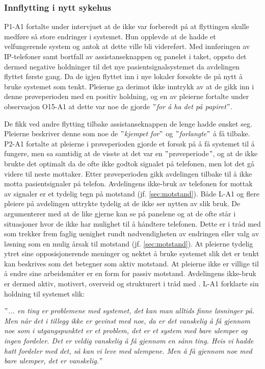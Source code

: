 \subsubsection{Innflytting i nytt sykehus}
P1-A1 fortalte under intervjuet at de ikke var forberedt på at flyttingen skulle medføre så store endringer i systemet. Hun opplevde at de hadde et velfungerende system og antok at dette ville bli videreført. Med innføringen av IP-telefoner samt bortfall av assistanseknappen og panelet i taket, oppsto det dermed negative holdninger til det nye pasientsignalsystemet da avdelingen flyttet første gang. Da de igjen flyttet inn i nye lokaler forsøkte de på nytt å bruke systemet som tenkt. Pleierne ga derimot ikke inntrykk av at de gikk inn i denne prøveperioden med en positiv holdning, og en av pleierne fortalte under observasjon O15-A1 at dette var noe de gjorde \textit{$"$for å ha det på papiret$"$}. 

\noindent
De fikk ved andre flytting tilbake assistanseknappen de lenge hadde ønsket seg. Pleierne beskriver denne som noe de \textit{$"$kjempet for$"$} og \textit{$"$forlangte$"$} å få tilbake. P2-A1 fortalte at pleierne i prøveperioden gjorde et forsøk på å få systemet til å fungere, men sa samtidig at de visste at det var en $"$prøveperiode$"$, og at de ikke brukte det optimalt da de ofte ikke godtok signalet på telefonen, men lot det gå videre til neste mottaker. Etter prøveperioden gikk avdelingen tilbake til å ikke motta pasientsignaler på telefon. Avdelingens ikke-bruk av telefonen for mottak av signaler er et tydelig tegn på motstand (jf. \ref{sec:motstand}). Både L-A1 og flere pleiere på avdelingen uttrykte tydelig at de ikke ser nytten av slik bruk. De argumenterer med at de like gjerne kan se på panelene og at de ofte står i situasjoner hvor de ikke har mulighet til å håndtere telefonen. Dette er i tråd med \citet{Jacobsen12} som trekker frem faglig uenighet rundt nødvendigheten av endringen eller valg av løsning som en mulig årsak til motstand (jf. \ref{sec:motstand}). At pleierne tydelig ytret sine opposisjonerende meninger og nektet å bruke systemet slik det er tenkt kan beskrives som det \citet{Lapointe05} betegner som aktiv motstand. At pleierne ikke er villige til å endre sine arbeidsmåter er en form for passiv motstand. Avdelingens ikke-bruk er dermed aktiv, motivert, overveid og strukturert i tråd med \citet{Satchell09}. L-A1 forklarte sin holdning til systemet slik: 

\noindent
\textit{$"$... en ting er problemene med systemet, det kan man alltids finne løsninger på. Men når det i tillegg ikke er gevinst med noe, da er det vanskelig å få gjennom noe som i utgangspunktet er et problem, det er et system med bare ulemper og ingen fordeler. Det er veldig vanskelig å få gjennom en sånn ting. Hvis vi hadde hatt fordeler med det, så kan vi leve med ulempene. Men å få gjennom noe med bare ulemper, det er vanskelig.$"$}

